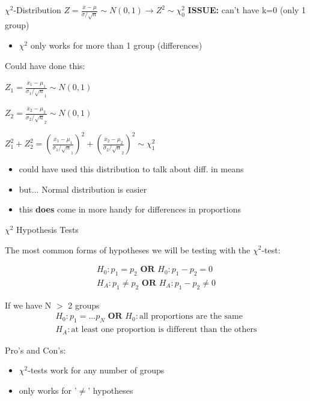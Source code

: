 \documentclass{beamer}
\begin{document}
\begin{frame}{$\chi^2$-Distribution}
$Z = \frac{\overline{x}-\mu}{\sigma / \sqrt{n}} \sim N(0,1) \rightarrow Z^2 \sim \chi^2_{0}$ \hspace{2mm} \textbf{ISSUE:} can't have k=0 (only 1 group)
\begin{itemize}
    \item $\chi^2$ only works for more than 1 group (differences)
\end{itemize}\vspace{8mm}

Could have done this:

$Z_1 = \frac{\overline{x}_1-\mu_1}{\sigma_1 / \sqrt{n}_1} \sim N(0,1)$

$Z_2 = \frac{\overline{x}_2-\mu_2}{\sigma_2 / \sqrt{n}_2} \sim N(0,1)$

$Z_1^2 + Z_2^2 = (\frac{\overline{x}_1-\mu_1}{\sigma_1 / \sqrt{n}_1})^2 + (\frac{\overline{x}_2-\mu_2}{\sigma_2 / \sqrt{n}_2})^2 \sim \chi^2_1$
\begin{itemize}
    \item could have used this distribution to talk about diff. in means
    \item but... Normal distribution is easier
    \item this \textbf{does} come in more handy for differences in proportions
\end{itemize}
\end{frame}

\begin{frame}{$\chi^2$ Hypothesis Tests}

The most common forms of hypotheses we will be testing with the $\chi^2$-test:

\begin{align*}
    H_0: p_1 = p_2 \textbf{ OR } H_0: p_1 - p_2 = 0\\
    H_A: p_1 \neq p_2 \textbf{ OR } H_A: p_1 - p_2 \neq 0
\end{align*}
\vspace{3mm}

If we have N $>$ 2 groups
\begin{align*}
    H_0: p_1 = ... p_N \textbf{ OR } H_0: \text{all proportions are the same}\\
    H_A: \text{at least one proportion is different than the others}
\end{align*} \vspace{3mm}

Pro's and Con's:
\begin{itemize}
    \item $\chi^2$-tests work for any number of groups
    \item only works for '$\neq$' hypotheses
\end{itemize}
\end{frame}
\end{document}
